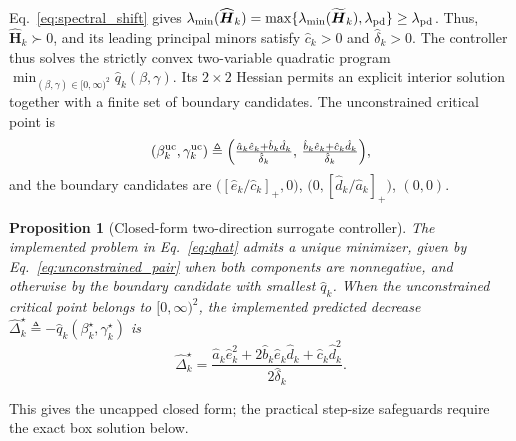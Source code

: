 \documentclass{article}
\newtheorem{proposition}{Proposition}
\theoremstyle{remark}
\newcommand{\bH}{\boldsymbol{H}}
\begin{document}
Eq.~\eqref{eq:spectral_shift} gives $\lambda_{\min}(\widehat{\bH}_k)=\max\{\lambda_{\min}(\widetilde{\bH}_k),\lambda_{\rm pd}\}\ge\lambda_{\rm pd}$.
Thus, $\widehat{\bH}_k\succ0$, and its leading principal minors satisfy $\hat c_k>0$ and $\hat\delta_k>0$.
The controller thus solves the strictly convex two-variable quadratic program $\min_{(\beta,\gamma)\in[0,\infty)^2}\hat q_k(\beta,\gamma)$.
Its $2\times2$ Hessian permits an explicit interior solution together with a finite set of boundary candidates.
The unconstrained critical point is
\begin{equation}\label{eq:unconstrained_pair}
(\beta_{k}^{\rm uc},\gamma_{k}^{\rm uc})
\triangleq
\Bigl(\tfrac{\hat a_{k}\hat e_{k}+\hat b_{k}\hat d_{k}}{\hat\delta_{k}},\,
\tfrac{\hat b_{k}\hat e_{k}+\hat c_{k}\hat d_{k}}{\hat\delta_{k}}\Bigr),
\end{equation}
and the boundary candidates are $\bigl([\hat e_{k}/\hat c_{k}]_{+},0\bigr)$, $\bigl(0,[\hat d_{k}/\hat a_{k}]_{+}\bigr)$, $(0,0)$.

\begin{proposition}[Closed-form two-direction surrogate controller]\label{prop:closed_form}
The implemented problem in Eq.~\eqref{eq:qhat} admits a unique minimizer, given by Eq.~\eqref{eq:unconstrained_pair} when both components are nonnegative, and otherwise by the boundary candidate with smallest $\hat q_{k}$.
When the unconstrained critical point belongs to $[0,\infty)^2$, the implemented predicted decrease $\widehat\Delta_{k}^{\star}\triangleq -\hat q_{k}(\beta_{k}^{\star},\gamma_{k}^{\star})$ is
\begin{equation}\label{eq:Delta_hat_interior}
\widehat\Delta_{k}^{\star}=\frac{\hat a_{k}\hat e_{k}^{2}+2\hat b_{k}\hat e_{k}\hat d_{k}+\hat c_{k}\hat d_{k}^{2}}{2\hat\delta_{k}}.
\end{equation}
\end{proposition}

This gives the uncapped closed form; the practical step-size safeguards require the exact box solution below.
\end{document}
